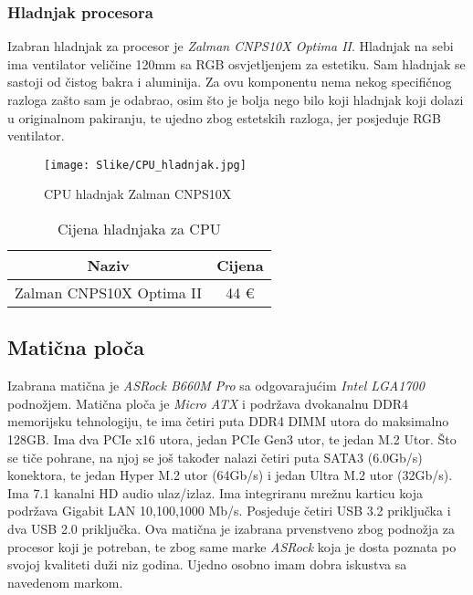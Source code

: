 \documentclass{article}
\begin{document}
    \clearpage
    \subsubsection{Hladnjak procesora}
    Izabran hladnjak za procesor je \textit{Zalman CNPS10X Optima II}. Hladnjak na sebi ima ventilator veličine 120mm sa RGB osvjetljenjem za estetiku. Sam hladnjak se sastoji od čistog bakra i aluminija. Za ovu komponentu nema nekog specifičnog razloga zašto sam je odabrao, osim što je bolja nego bilo koji hladnjak koji dolazi u originalnom pakiranju, te ujedno zbog estetskih razloga, jer posjeduje RGB ventilator.

    \begin{figure}[H]
        \centering
        \texttt{[image: Slike/CPU\_hladnjak.jpg]}
        \caption{CPU hladnjak Zalman CNPS10X}
        \label{fig:Hladnjak}
    \end{figure}

    \begin{table}[H]
        \centering
        \begin{tabular}{|c|c|}
            \hline
            Naziv & Cijena \\
            \hline
            Zalman CNPS10X Optima II & 44 € \\
            \hline
        \end{tabular}
        \caption{Cijena hladnjaka za CPU}
        \label{tab:Hladnjak}
    \end{table}

    \clearpage
    \subsection{Matična ploča}
    Izabrana matična je \textit{ASRock B660M Pro} sa odgovarajućim \textit{Intel LGA1700} podnožjem. Matična ploča je \textit{Micro ATX} i podržava dvokanalnu DDR4 memorijsku tehnologiju, te ima četiri puta DDR4 DIMM utora do maksimalno 128GB. Ima dva PCIe x16 utora, jedan PCIe Gen3 utor, te jedan M.2 Utor. Što se tiče pohrane, na njoj se još također nalazi četiri puta SATA3 (6.0Gb/s) konektora, te jedan Hyper M.2 utor (64Gb/s) i jedan Ultra M.2 utor (32Gb/s). Ima 7.1 kanalni HD audio ulaz/izlaz. Ima integriranu mrežnu karticu koja podržava Gigabit LAN 10,100,1000 Mb/s. Posjeduje četiri USB 3.2 priključka i dva USB 2.0 priključka. Ova matična je izabrana prvenstveno zbog podnožja za procesor koji je potreban, te zbog same marke \textit{ASRock} koja je dosta poznata po svojoj kvaliteti duži niz godina. Ujedno osobno imam dobra iskustva sa navedenom markom.
\end{document}
